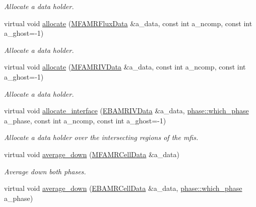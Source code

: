 \begin{DoxyCompactItemize}
\begin{DoxyCompactList}\small\item\em Allocate a data holder. \end{DoxyCompactList}\item 
virtual void \hyperlink{classamr__mesh_aa67f1e0e006e798cab01a56aa4508d94}{allocate} (\hyperlink{type__definitions_8H_a4033d82364b7e6655b58257749d7881f}{M\+F\+A\+M\+R\+Flux\+Data} \&a\+\_\+data, const int a\+\_\+ncomp, const int a\+\_\+ghost=-\/1)
\begin{DoxyCompactList}\small\item\em Allocate a data holder. \end{DoxyCompactList}\item 
virtual void \hyperlink{classamr__mesh_abca8d034192f1d41f93bda61865aac99}{allocate} (\hyperlink{type__definitions_8H_a559707b00625e419df1a59d9501220de}{M\+F\+A\+M\+R\+I\+V\+Data} \&a\+\_\+data, const int a\+\_\+ncomp, const int a\+\_\+ghost=-\/1)
\begin{DoxyCompactList}\small\item\em Allocate a data holder. \end{DoxyCompactList}\item 
virtual void \hyperlink{classamr__mesh_a43d026d6c8a28cc4657d5355aa9a7f9b}{allocate\+\_\+interface} (\hyperlink{type__definitions_8H_a6b8fa905d55cbb491b52180386f0e0c1}{E\+B\+A\+M\+R\+I\+V\+Data} \&a\+\_\+data, \hyperlink{namespacephase_a23c76f548a5eb1955ed8c929c541108b}{phase\+::which\+\_\+phase} a\+\_\+phase, const int a\+\_\+ncomp, const int a\+\_\+ghost=-\/1)
\begin{DoxyCompactList}\small\item\em Allocate a data holder over the intersecting regions of the mfis. \end{DoxyCompactList}\item 
virtual void \hyperlink{classamr__mesh_a6e52b2d79834002c18659e5a8fc3a543}{average\+\_\+down} (\hyperlink{type__definitions_8H_aced885351d40daa466564acbee4042d3}{M\+F\+A\+M\+R\+Cell\+Data} \&a\+\_\+data)
\begin{DoxyCompactList}\small\item\em Average down both phases. \end{DoxyCompactList}\item 
virtual void \hyperlink{classamr__mesh_abafe0f3a2ef19b6ed1c9032dec0d025a}{average\+\_\+down} (\hyperlink{type__definitions_8H_a7e610f301989e5e07781c5e338bdb7c3}{E\+B\+A\+M\+R\+Cell\+Data} \&a\+\_\+data, \hyperlink{namespacephase_a23c76f548a5eb1955ed8c929c541108b}{phase\+::which\+\_\+phase} a\+\_\+phase)

\end{DoxyCompactItemize}
